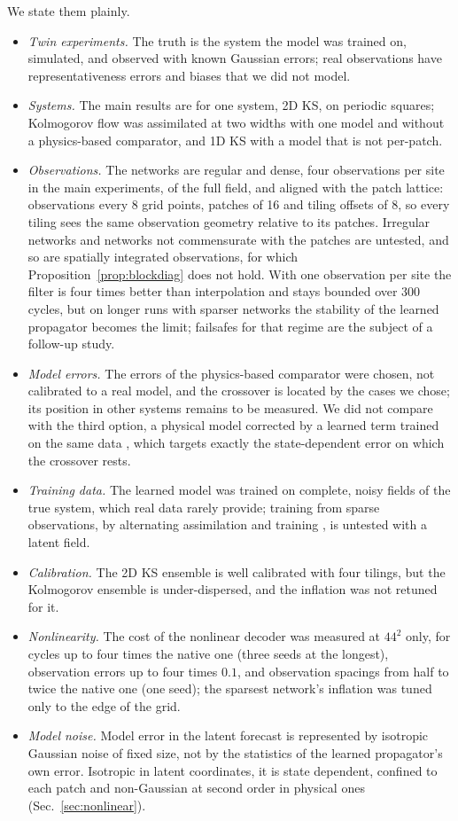  We state them plainly.
\begin{itemize}
\item \emph{Twin experiments.} The truth is the system the model was trained
  on, simulated, and observed with known Gaussian errors; real observations
  have representativeness errors and biases that we did not model.
\item \emph{Systems.} The main results are for one system, 2D KS, on
  periodic squares; Kolmogorov flow was assimilated at two widths with one
  model and without a physics-based comparator, and 1D KS with a model that
  is not per-patch.
\item \emph{Observations.} The networks are regular and dense, four
  observations per site in the main experiments, of the full field, and
  aligned with the patch lattice: observations every 8 grid points, patches
  of 16 and tiling offsets of 8, so every tiling sees the same observation
  geometry relative to its patches. Irregular networks and networks not
  commensurate with the patches are untested, and so are spatially
  integrated observations, for which Proposition~\ref{prop:blockdiag} does
  not hold. With
  one observation per site the filter is four times better than
  interpolation and stays bounded over 300 cycles, but on longer runs with
  sparser networks the stability of the learned propagator becomes the
  limit; failsafes for that regime are the subject of a follow-up study.
\item \emph{Model errors.} The errors of the physics-based comparator were
  chosen, not calibrated to a real model, and the crossover is located by
  the cases we chose; its position in other systems remains to be measured.
  We did not compare with the third option, a physical model corrected by a
  learned term trained on the same data \citep{pathak2018hybrid}, which
  targets exactly the state-dependent error on which the crossover rests.
\item \emph{Training data.} The learned model was trained on complete,
  noisy fields of the true system, which real data rarely provide; training
  from sparse observations, by alternating assimilation and training
  \citep{brajard2020,bocquet2020}, is untested with a latent field.
\item \emph{Calibration.} The 2D KS ensemble is well calibrated with four
  tilings, but the Kolmogorov ensemble is under-dispersed, and the
  inflation was not retuned for it.
\item \emph{Nonlinearity.} The cost of the nonlinear decoder was measured
  at $44^2$ only, for cycles up to four times the native one (three seeds at
  the longest), observation errors up to four times $0.1$, and observation
  spacings from half to twice the native one (one seed); the sparsest
  network's inflation was tuned only to the edge of the grid.
\item \emph{Model noise.} Model error in the latent forecast is represented
  by isotropic Gaussian noise of fixed size, not by the statistics of the
  learned propagator's own error. Isotropic in latent coordinates, it is
  state dependent, confined to each patch and non-Gaussian at second order
  in physical ones (Sec.~\ref{sec:nonlinear}).
\end{itemize}

